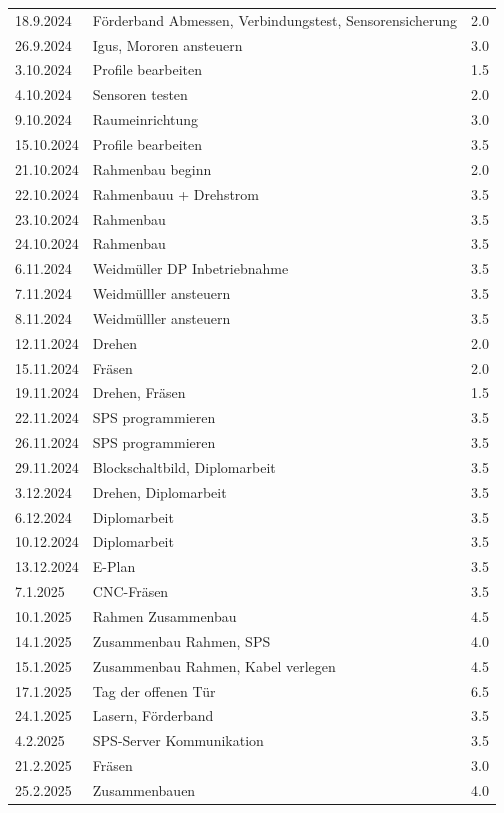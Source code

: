 \begin{longtable}{|l|p{10cm}|r|}
    18.9.2024	&	Förderband Abmessen, Verbindungstest, Sensorensicherung	&	2.0 \\
    26.9.2024	&	Igus, Mororen ansteuern	&	3.0 \\
    3.10.2024	&	Profile bearbeiten	&	1.5\\
    4.10.2024	&	Sensoren testen	&	2.0\\
    9.10.2024	&	Raumeinrichtung	&	3.0\\
    15.10.2024	&	Profile bearbeiten	&	3.5\\
    21.10.2024	&	Rahmenbau beginn	&	2.0\\
    22.10.2024	&	Rahmenbauu + Drehstrom	&	3.5\\
    23.10.2024	&	Rahmenbau	&	3.5\\
    24.10.2024	&	Rahmenbau	&	3.5\\
    6.11.2024	&	Weidmüller DP Inbetriebnahme	&	3.5\\
    7.11.2024	&	Weidmülller ansteuern	&	3.5\\
    8.11.2024	&	Weidmülller ansteuern	&	3.5\\
    12.11.2024	&	Drehen	&	2.0\\
    15.11.2024	&	Fräsen	&	2.0\\
    19.11.2024	&	Drehen, Fräsen	&	1.5\\
    22.11.2024	&	SPS programmieren	&	3.5\\
    26.11.2024	&	SPS programmieren	&	3.5\\
    29.11.2024	&	Blockschaltbild, Diplomarbeit	&	3.5\\
    3.12.2024	&	Drehen, Diplomarbeit	&	3.5\\
    6.12.2024	&   Diplomarbeit	&	3.5\\
    10.12.2024	&	Diplomarbeit	&	3.5\\
    13.12.2024	&	E-Plan 	&	3.5\\
    7.1.2025	&	CNC-Fräsen	&	3.5\\
    10.1.2025	&	Rahmen Zusammenbau	&	4.5\\
    14.1.2025	&	Zusammenbau Rahmen, SPS	&	4.0\\
    15.1.2025	&	Zusammenbau Rahmen, Kabel verlegen	&	4.5\\
    17.1.2025	&	Tag der offenen Tür	&	6.5\\
    24.1.2025	&	Lasern, Förderband  &	3.5\\
    4.2.2025	&	SPS-Server Kommunikation	&	3.5\\
    21.2.2025	&   Fräsen	&	3.0\\
    25.2.2025	&	Zusammenbauen	&	4.0\\

\end{longtable}
